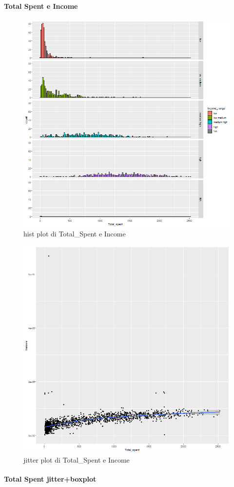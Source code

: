 \documentclass[letterpaper,11pt]{article}
\begin{document}
\newpage
\paragraph{Total Spent e Income}



\begin{figure}[h!]
    \centering
    \includegraphics[width=.5\textwidth]{Img/EDA/EDA034.png}
    \caption{hist plot di Total\_Spent e Income}
\end{figure}



\begin{figure}[h!]
    \centering
    \includegraphics[width=.5\textwidth]{Img/EDA/EDA035.png}
    \caption{jitter plot di Total\_Spent e Income}
\end{figure}

\newpage

\paragraph{Total Spent jitter+boxplot}
\end{document}
